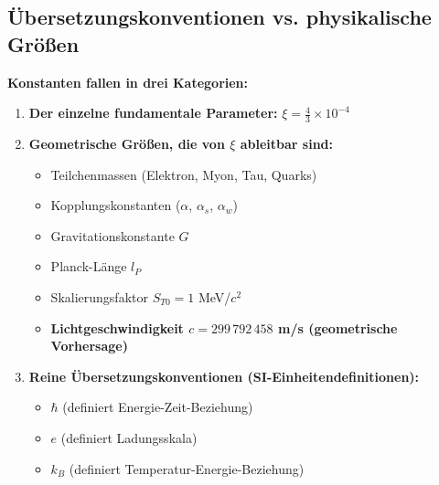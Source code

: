 \documentclass[12pt,a4paper]{article}
\begin{document}
	\subsection{{\"U}bersetzungskonventionen vs. physikalische Gr{\"o}{\ss}en}
	
	\begin{keyresult}
		\textbf{Konstanten fallen in drei Kategorien:}
		\begin{enumerate}
			\item \textbf{Der einzelne fundamentale Parameter:} $\xi = \frac{4}{3} \times 10^{-4}$
			
			\item \textbf{Geometrische Gr{\"o}{\ss}en, die von $\xi$ ableitbar sind:}
			\begin{itemize}
				\item Teilchenmassen (Elektron, Myon, Tau, Quarks)
				\item Kopplungskonstanten ($\alpha$, $\alpha_s$, $\alpha_w$)
				\item Gravitationskonstante $G$
				\item Planck-L{\"a}nge $l_P$
				\item Skalierungsfaktor $S_{T0} = 1$ MeV/$c^2$
				\item \textbf{Lichtgeschwindigkeit $c = 299\,792\,458$ m/s (geometrische Vorhersage)}
			\end{itemize}
			
			\item \textbf{Reine {\"U}bersetzungskonventionen (SI-Einheitendefinitionen):}
			\begin{itemize}
				\item $\hbar$ (definiert Energie-Zeit-Beziehung)
				\item $e$ (definiert Ladungsskala)
				\item $k_B$ (definiert Temperatur-Energie-Beziehung)
			\end{itemize}
		\end{enumerate}
	\end{keyresult}
	
\end{document}
